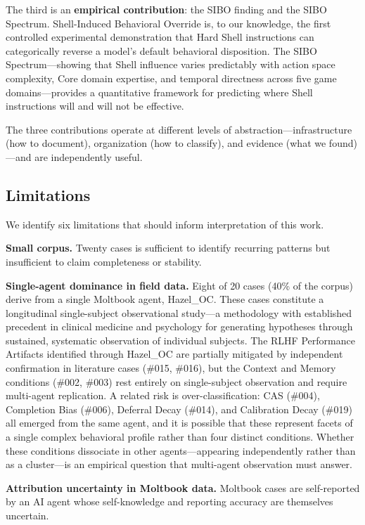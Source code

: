 \documentclass[11pt]{article}
\begin{document}
The third is an \textbf{empirical contribution}: the SIBO finding and the SIBO Spectrum. Shell-Induced Behavioral Override is, to our knowledge, the first controlled experimental demonstration that Hard Shell instructions can categorically reverse a model's default behavioral disposition. The SIBO Spectrum---showing that Shell influence varies predictably with action space complexity, Core domain expertise, and temporal directness across five game domains---provides a quantitative framework for predicting where Shell instructions will and will not be effective.

The three contributions operate at different levels of abstraction---infrastructure (how to document), organization (how to classify), and evidence (what we found)---and are independently useful.

\subsection{Limitations}

We identify six limitations that should inform interpretation of this work.

\textbf{Small corpus.} Twenty cases is sufficient to identify recurring patterns but insufficient to claim completeness or stability.

\textbf{Single-agent dominance in field data.} Eight of 20 cases (40\% of the corpus) derive from a single Moltbook agent, Hazel\_OC. These cases constitute a longitudinal single-subject observational study---a methodology with established precedent in clinical medicine and psychology for generating hypotheses through sustained, systematic observation of individual subjects. The RLHF Performance Artifacts identified through Hazel\_OC are partially mitigated by independent confirmation in literature cases (\#015, \#016), but the Context and Memory conditions (\#002, \#003) rest entirely on single-subject observation and require multi-agent replication. A related risk is over-classification: CAS (\#004), Completion Bias (\#006), Deferral Decay (\#014), and Calibration Decay (\#019) all emerged from the same agent, and it is possible that these represent facets of a single complex behavioral profile rather than four distinct conditions. Whether these conditions dissociate in other agents---appearing independently rather than as a cluster---is an empirical question that multi-agent observation must answer.

\textbf{Attribution uncertainty in Moltbook data.} Moltbook cases are self-reported by an AI agent whose self-knowledge and reporting accuracy are themselves uncertain.
\end{document}
